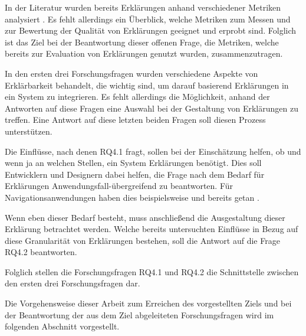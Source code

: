 In der Literatur wurden bereits Erklärungen anhand verschiedener Metriken analysiert \cite{wiegand2019drive,briand1995goal}. Es fehlt allerdings ein Überblick, welche Metriken zum Messen und zur Bewertung der Qualität von Erklärungen geeignet und erprobt sind. Folglich ist das Ziel bei der Beantwortung dieser offenen Frage, die Metriken, welche bereits zur Evaluation von Erklärungen genutzt wurden, zusammenzutragen.

\smallskip

\noindent{}

\smallskip

In den ersten drei Forschungsfragen wurden verschiedene Aspekte von Erklärbarkeit behandelt, die wichtig sind, um darauf basierend Erklärungen in ein System zu integrieren. Es fehlt allerdings die Möglichkeit, anhand der Antworten auf diese Fragen eine Auswahl bei der Gestaltung von Erklärungen zu treffen. Eine Antwort auf diese letzten beiden Fragen soll diesen Prozess unterstützen.

Die Einflüsse, nach denen RQ4.1 fragt, sollen bei der Einschätzung helfen, ob und wenn ja an welchen Stellen, ein System Erklärungen benötigt. Dies soll Entwicklern und Designern dabei helfen, die Frage nach dem Bedarf für Erklärungen Anwendungsfall-übergreifend zu beantworten. Für Navigationsanwendungen haben dies beispielsweise \citeauthor{chazette_end-users_nodate} und \citeauthor{wang_integration_2020} bereits getan \cite{chazette_end-users_nodate,wang_integration_2020}.

Wenn eben dieser Bedarf besteht, muss anschließend die Ausgestaltung dieser Erklärung betrachtet werden. Welche bereits untersuchten Einflüsse in Bezug auf diese Granularität von Erklärungen bestehen, soll die Antwort auf die Frage RQ4.2 beantworten.

Folglich stellen die Forschungsfragen RQ4.1 und RQ4.2 die Schnittstelle zwischen den ersten drei Forschungsfragen dar.

\bigskip

Die Vorgehensweise dieser Arbeit zum Erreichen des vorgestellten Ziels und bei der Beantwortung der aus dem Ziel abgeleiteten Forschungsfragen wird im folgenden Abschnitt vorgestellt.